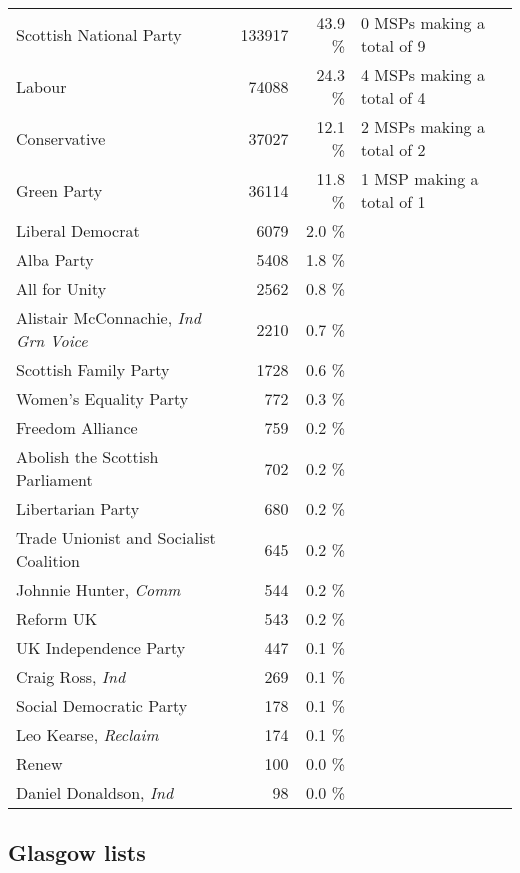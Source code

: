 \noindent
\begin{tabular*}{\textwidth}{@{\extracolsep{\fill}} p{}<{\dotfill} r r<{\%} p{} @{\extracolsep{\fill}}}
	Scottish National Party & 133917 & 43.9 & 0 MSPs making a total of 9\\
	Labour & 74088 & 24.3 & 4 MSPs making a total of 4\\
	Conservative & 37027 & 12.1 & 2 MSPs making a total of 2\\
	Green Party & 36114 & 11.8 & 1 MSP making a total of 1\\
	Liberal Democrat & 6079 & 2.0 & \\
	Alba Party & 5408 & 1.8 & \\
	All for Unity & 2562 & 0.8 & \\
	Alistair McConnachie, \emph{Ind Grn Voice} & 2210 & 0.7 & \\
	Scottish Family Party & 1728 & 0.6 & \\
	Women's Equality Party & 772 & 0.3 & \\
	Freedom Alliance & 759 & 0.2 & \\
	Abolish the Scottish Parliament & 702 & 0.2 & \\
	Libertarian Party & 680 & 0.2 & \\
	Trade Unionist and Socialist Coalition & 645 & 0.2 & \\
	Johnnie Hunter, \emph{Comm} & 544 & 0.2 & \\
	Reform UK & 543 & 0.2 & \\
	UK Independence Party & 447 & 0.1 & \\
	Craig Ross, \emph{Ind} & 269 & 0.1 & \\
	Social Democratic Party & 178 & 0.1 & \\
	Leo Kearse, \emph{Reclaim} & 174 & 0.1 & \\
	Renew & 100 & 0.0 & \\
	Daniel Donaldson, \emph{Ind} & 98 & 0.0 & \\
\end{tabular*}

\vfill\eject

\subsection*{Glasgow lists}

